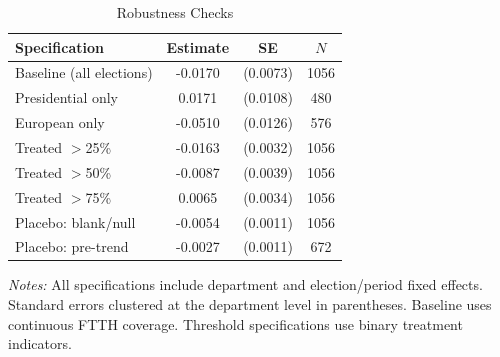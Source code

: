 \begin{table}[htbp]
\centering
\caption{Robustness Checks}
\label{tab:robustness}
\begin{tabular}{lccc}
\hline\hline
Specification & Estimate & SE & $N$ \\
\hline
Baseline (all elections) & -0.0170 & (0.0073) & 1056 \\
Presidential only & 0.0171 & (0.0108) & 480 \\
European only & -0.0510 & (0.0126) & 576 \\
Treated $>$25\% & -0.0163 & (0.0032) & 1056 \\
Treated $>$50\% & -0.0087 & (0.0039) & 1056 \\
Treated $>$75\% & 0.0065 & (0.0034) & 1056 \\
Placebo: blank/null & -0.0054 & (0.0011) & 1056 \\
Placebo: pre-trend & -0.0027 & (0.0011) & 672 \\
\hline\hline
\end{tabular}
\begin{minipage}{0.85\textwidth}
\vspace{0.3em}
\footnotesize \emph{Notes:} All specifications include department and election/period fixed effects. Standard errors clustered at the department level in parentheses. Baseline uses continuous FTTH coverage. Threshold specifications use binary treatment indicators.
\end{minipage}
\end{table}
